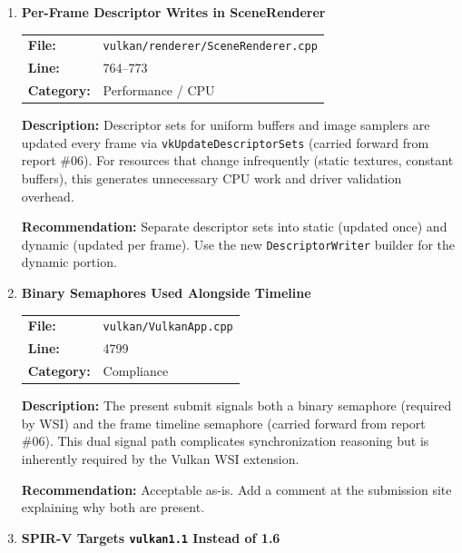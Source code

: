 \documentclass[a4paper,12pt]{article}
\newcommand{\severitybox}[2]{%
  \colorbox{#1}{\makebox[2.5cm][c]{\textcolor{white}{\textbf{#2}}}}%
}
\begin{document}
\begin{enumerate}[leftmargin=*]

\item[\textbf{[P5]}] \textbf{Per-Frame Descriptor Writes in SceneRenderer}
  \hfill \severitybox{lowcolor}{LOW}

  \begin{tabular}{ll}
    \textbf{File:} & \texttt{vulkan/renderer/SceneRenderer.cpp} \\
    \textbf{Line:} & 764--773 \\
    \textbf{Category:} & Performance / CPU \\
  \end{tabular}

  \textbf{Description:}
  Descriptor sets for uniform buffers and image samplers are updated every
  frame via \texttt{vkUpdateDescriptorSets} (carried forward from report \#06).
  For resources that change infrequently (static textures, constant buffers),
  this generates unnecessary CPU work and driver validation overhead.

  \textbf{Recommendation:}
  Separate descriptor sets into static (updated once) and dynamic (updated
  per frame). Use the new \texttt{DescriptorWriter} builder for the dynamic
  portion.

\item[\textbf{[C2]}] \textbf{Binary Semaphores Used Alongside Timeline}
  \hfill \severitybox{lowcolor}{LOW}

  \begin{tabular}{ll}
    \textbf{File:} & \texttt{vulkan/VulkanApp.cpp} \\
    \textbf{Line:} & 4799 \\
    \textbf{Category:} & Compliance \\
  \end{tabular}

  \textbf{Description:}
  The present submit signals both a binary semaphore (required by WSI) and
  the frame timeline semaphore (carried forward from report \#06). This dual
  signal path complicates synchronization reasoning but is inherently
  required by the Vulkan WSI extension.

  \textbf{Recommendation:}
  Acceptable as-is. Add a comment at the submission site explaining why both
  are present.

\item[\textbf{[C3]}] \textbf{SPIR-V Targets \texttt{vulkan1.1} Instead of 1.6}
  \hfill \severitybox{lowcolor}{LOW}


\end{enumerate}
\end{document}
